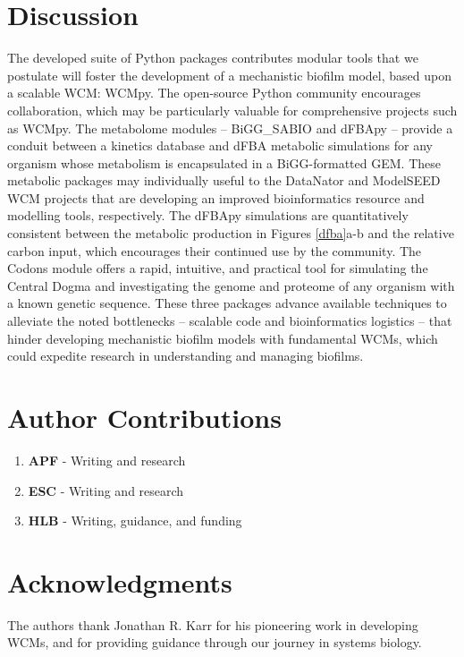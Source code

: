 \section{Discussion}
The developed suite of Python packages contributes modular tools that we postulate will foster the development of a mechanistic biofilm model, based upon a scalable WCM: WCMpy. The open-source Python community encourages collaboration, which may be particularly valuable for comprehensive projects such as WCMpy. The metabolome modules -- BiGG\_SABIO and dFBApy -- provide a conduit between a kinetics database and dFBA metabolic simulations for any organism whose metabolism is encapsulated in a BiGG-formatted GEM. These metabolic packages may individually useful to the DataNator \cite{Roth2021Datanator:Behavior} and ModelSEED \cite{Seaver2021TheMicrobes} WCM projects that are developing an improved bioinformatics resource and modelling tools, respectively. The dFBApy simulations are quantitatively consistent between the metabolic production in Figures \ref{dfba}a-b and the relative carbon input, which encourages their continued use by the community. The Codons module offers a rapid, intuitive, and practical tool for simulating the Central Dogma and investigating the genome and proteome of any organism with a known genetic sequence. These three packages advance available techniques to alleviate the noted bottlenecks -- scalable code and bioinformatics logistics -- that hinder developing mechanistic biofilm models with fundamental WCMs, which could expedite research in understanding and managing biofilms. 

\section{Author Contributions}
\begin{enumerate}
    \item \textbf{APF} - Writing and research
    \item \textbf{ESC} - Writing and research
    \item \textbf{HLB} - Writing, guidance, and funding
\end{enumerate}

\section{Acknowledgments}
The authors thank Jonathan R. Karr for his pioneering work in developing WCMs, and for providing guidance through our journey in systems biology.

